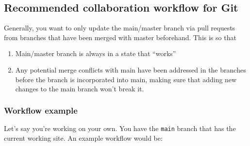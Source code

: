 \documentclass[
]{article}
\author{}
\date{\vspace{-2.5em}}
\providecommand{\tightlist}{%
  \setlength{\itemsep}{0pt}\setlength{\parskip}{0pt}}
\begin{document}
\hypertarget{recommended-collaboration-workflow-for-git}{%
\subsection{Recommended collaboration workflow for
Git}\label{recommended-collaboration-workflow-for-git}}

Generally, you want to only update the main/master branch via pull
requests from branches that have been merged with master beforehand.
This is so that

\begin{enumerate}
\def\labelenumi{\arabic{enumi}.}
\tightlist
\item
  Main/master branch is always in a state that ``works''
\item
  Any potential merge conflicts with main have been addressed in the
  branches before the branch is incorporated into main, making sure that
  adding new changes to the main branch won't break it.
\end{enumerate}

\hypertarget{workflow-example}{%
\subsubsection{Workflow example}\label{workflow-example}}

Let's say you're working on your own. You have the \texttt{main} branch
that has the current working site. An example workflow would be:
\end{document}
